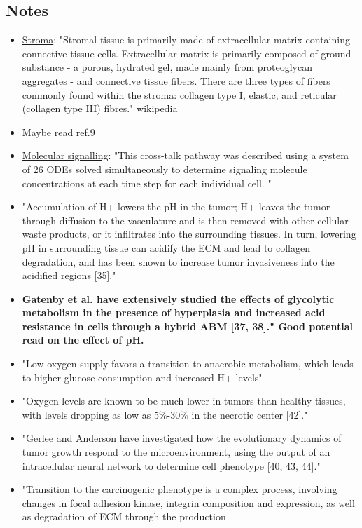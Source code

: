 \documentclass[11pt,a4paper]{article}
\begin{document}
\subsection*{Notes}
\begin{itemize}
\item \underline{Stroma}: "Stromal tissue is primarily made of extracellular matrix containing connective tissue cells. Extracellular matrix is primarily composed of ground substance - a porous, hydrated gel, made mainly from proteoglycan aggregates - and connective tissue fibers. There are three types of fibers commonly found within the stroma: collagen type I, elastic, and reticular (collagen type III) fibres." wikipedia 
\item Maybe read ref.9
\item \underline{Molecular signalling}: "This cross-talk pathway was described using a system of 26 ODEs solved simultaneously to determine signaling molecule concentrations at each time step for each individual cell. "
\item "Accumulation of H+ lowers the pH in the tumor; H+ leaves the tumor through diffusion to the vasculature and is then removed with other cellular waste products, or it infiltrates into the surrounding tissues. In turn, lowering pH in surrounding tissue can acidify the ECM and lead to collagen degradation, and has been shown to increase tumor invasiveness into the acidified regions [35]."
\item \textbf{Gatenby et al. have extensively studied the effects of glycolytic metabolism in the presence
of hyperplasia and increased acid resistance in cells through a hybrid ABM [37, 38]." Good potential read on the effect of pH.}
\item "Low oxygen supply favors a transition to anaerobic metabolism, which leads to higher glucose consumption and increased H+ levels"
\item "Oxygen levels are known to be much lower in tumors than healthy tissues, with levels dropping as low as 5\%-30\% in the necrotic center [42]."
\item "Gerlee and Anderson have investigated how the evolutionary dynamics of tumor growth respond to the microenvironment, using the output of an intracellular neural network to determine cell phenotype [40, 43, 44]."
\item "Transition to the carcinogenic phenotype is a complex process, involving changes in focal adhesion kinase,
integrin composition and expression, as well as degradation of ECM through the production

\end{itemize}
\end{document}
